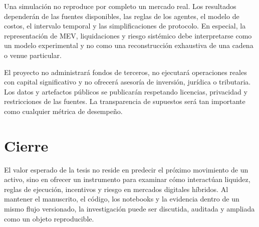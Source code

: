 Una simulación no reproduce por completo un mercado real. Los resultados dependerán de las fuentes disponibles, las reglas de los agentes, el modelo de costos, el intervalo temporal y las simplificaciones de protocolo. En especial, la representación de MEV, liquidaciones y riesgo sistémico debe interpretarse como un modelo experimental y no como una reconstrucción exhaustiva de una cadena o venue particular.

El proyecto no administrará fondos de terceros, no ejecutará operaciones reales con capital significativo y no ofrecerá asesoría de inversión, jurídica o tributaria. Los datos y artefactos públicos se publicarán respetando licencias, privacidad y restricciones de las fuentes. La transparencia de supuestos será tan importante como cualquier métrica de desempeño.

\section{Cierre}

El valor esperado de la tesis no reside en predecir el próximo movimiento de un activo, sino en ofrecer un instrumento para examinar cómo interactúan liquidez, reglas de ejecución, incentivos y riesgo en mercados digitales híbridos. Al mantener el manuscrito, el código, los notebooks y la evidencia dentro de un mismo flujo versionado, la investigación puede ser discutida, auditada y ampliada como un objeto reproducible.
